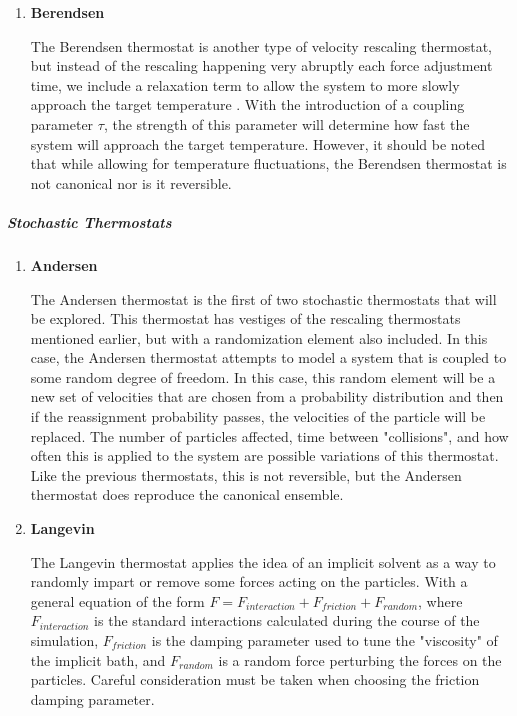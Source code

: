 \documentclass[9pt,bestpractices]{livecoms}
\begin{document}
\begin{enumerate}[listparindent=\parindent]
    \item \textbf{Berendsen}

        The Berendsen thermostat is another type of
        velocity rescaling thermostat, but instead of the rescaling happening
        very abruptly each force adjustment time, we include a relaxation term
        to allow the system to more slowly approach the target
        temperature\cite{berendsen1984molecular} . With the introduction of a
        coupling parameter $\tau$, the strength of this parameter will determine
        how fast the system will approach the target temperature. However, it
        should be noted that while allowing for temperature fluctuations, the
        Berendsen thermostat is not canonical nor is it reversible.

\end{enumerate}

\subparagraph{Stochastic Thermostats}
\begin{enumerate}[listparindent=\parindent]
    \item \textbf{Andersen}

        The Andersen\cite{andersen1980molecular} thermostat is the first of two
        stochastic thermostats that will be explored.  This thermostat has
        vestiges of the rescaling thermostats mentioned earlier, but with a
        randomization element also included. In this case, the Andersen
        thermostat attempts to model a system that is coupled to some random
        degree of freedom\cite{andersen1980molecular, thermostatAlgorithms2005}.
        In this case, this random element will be a new set of velocities that
        are chosen from a probability distribution and then if the reassignment
        probability passes, the velocities of the particle will be replaced. The
        number of particles affected, time between "collisions", and how often
        this is applied to the system are possible variations of this
        thermostat. Like the previous thermostats, this is not reversible, but
        the Andersen thermostat does reproduce the canonical ensemble.
    
    \item \textbf{Langevin}

        The Langevin\cite{schneider1978molecular} thermostat applies the idea
        of an implicit solvent as a way to randomly impart or remove some forces
        acting on the particles.  With a general equation of the form $F =
        F_{interaction} + F_{friction} + F_{random}$, where $F_{interaction}$ is
        the standard interactions calculated during the course of the
        simulation, $F_{friction}$ is the damping parameter used to tune the
        "viscosity" of the implicit bath, and $F_{random}$ is a random force
        perturbing the forces on the particles.  Careful consideration must be
        taken when choosing the friction damping parameter.


\end{enumerate}
\end{document}
